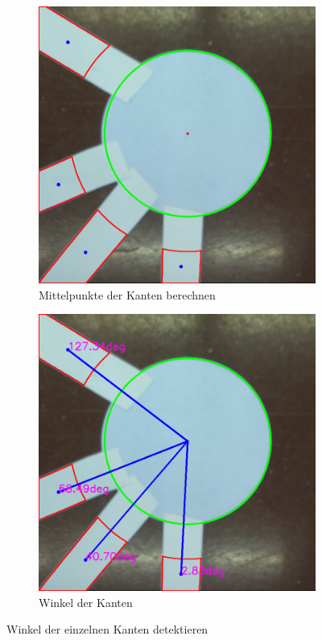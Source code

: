 \begin{enumerate}
\begin{figure}[H]
\begin{subfigure}{0.4\textwidth}
        \includegraphics[width=0.95\linewidth]{assets/informatik-prototyp/opencv/angle_detection/edge_detect_centers.png} 
        \caption{Mittelpunkte der Kanten berechnen}
        \label{fig:edge-center}
        \end{subfigure}
        \begin{subfigure}{0.4\textwidth}
        \includegraphics[width=0.95\linewidth]{assets/informatik-prototyp/opencv/angle_detection/node_with_edge_angles_annotated.png} 
        \caption{Winkel der Kanten}
        \label{fig:angle-lines}
        \end{subfigure}
        \caption{Winkel der einzelnen Kanten detektieren}
        \label{fig:node-with-edge-angles}
        \end{figure}
\end{enumerate}

